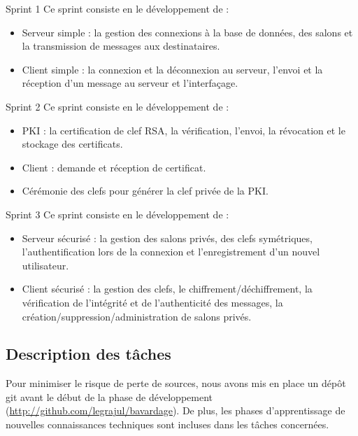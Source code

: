 \documentclass[a4paper,11pt,french]{article}
\begin{document}
\begin{paragraph}{Sprint 1}
Ce sprint consiste en le développement de :
\begin{itemize}
\item Serveur simple : la gestion des connexions à la base de données, des salons et la transmission de messages aux destinataires.
\item Client simple : la connexion et la déconnexion au serveur, l'envoi et la réception d'un message au serveur et l'interfaçage.
\end{itemize}
\end{paragraph}

\begin{paragraph}{Sprint 2}
Ce sprint consiste en le développement de :
\begin{itemize}
\item PKI : la certification de clef RSA, la vérification, l'envoi, la révocation et le stockage des certificats.
\item Client : demande et réception de certificat.
\item Cérémonie des clefs pour générer la clef privée de la PKI.
\end{itemize}
\end{paragraph}

\begin{paragraph}{Sprint 3}
Ce sprint consiste en le développement de :
\begin{itemize}
\item Serveur sécurisé : la gestion des salons privés, des clefs symétriques, l'authentification lors de la connexion et l'enregistrement d'un nouvel utilisateur.
\item Client sécurisé : la gestion des clefs, le chiffrement/déchiffrement, la vérification de l'intégrité et de l'authenticité des messages, la création/suppression/administration de salons privés.
\end{itemize}
\end{paragraph}

\subsection{Description des tâches}
Pour minimiser le risque de perte de sources, nous avons mis en place un dépôt git avant le début de la phase de développement (\url{http://github.com/legrajul/bavardage}). De plus, les phases d'apprentissage de nouvelles connaissances techniques sont incluses dans les tâches concernées.
~~\\
\end{document}
